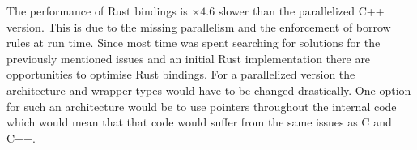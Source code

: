 \documentclass[thesis]{subfiles}
\begin{document}
The performance of Rust bindings is $\times 4.6$ slower than the parallelized C++ version.
This is due to the missing parallelism and the enforcement of borrow rules at run time.
Since most time was spent searching for solutions for the previously mentioned issues and an initial Rust implementation there are opportunities to optimise Rust bindings.
For a parallelized version the architecture and wrapper types would have to be changed drastically.
One option for such an architecture would be to use pointers throughout the internal code which would mean that that code would suffer from the same issues as C and C++.
\end{document}
